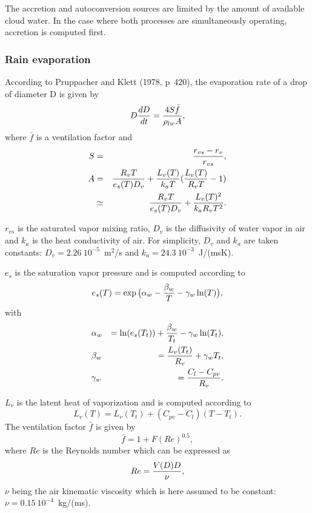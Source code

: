 The accretion and autoconversion sources are limited by the amount of available
cloud water. In the case where both processes are simultaneously operating,
accretion is computed first.

\subsubsection{Rain evaporation}
According to Pruppacher and Klett (1978, p~420), the evaporation rate of a drop
of diameter D is given by
\begin{equation}
D {dD \over dt} = {4S \bar f \over \rho_{lw} A}, \label{eq17}
\end{equation}
where $\bar f$ is a ventilation factor and
\begin{eqnarray}
S&=& {r_{vs}-r_v \over r_{vs}}, \\
A&=& {R_v T \over e_s(T) D_v} + {L_v(T) \over k_a T}({L_v(T) \over R_v T} -1)\\
 &\simeq &{R_v T \over e_s(T) D_v} + {L_v(T)^2 \over k_a R_v T^2}  .
\end{eqnarray}

$r_{vs}$ is the saturated vapor mixing ratio, $D_v$ is the diffusivity of water
vapor in air and $k_a$ is the heat conductivity of air.
For simplicity, $D_v$ and  $k_a$ are taken constants:
$D_v=2.26\ 10^{-5}$~m$^2$/s and $k_a= 24.3 \ 10 ^{-3}$~J/(msK).

$e_s$ is the saturation vapor pressure and is computed according to
\begin{equation}
\label{eq21}
e_s(T)= \exp \big( \alpha_w - {\beta_w \over T} - \gamma_w \ln (T) \big),
\end{equation}
with
\begin{eqnarray}
&\alpha_w   &= \ln (e_s(T_t))+{\beta_w \over T_t} - \gamma_w \ln (T_t), \\
&\beta_w   &= {L_v(T_t) \over R_v} + \gamma_w T_t, \\
&\gamma_w  &= {C_l -C_{pv} \over R_v}.
\end{eqnarray}

$L_v$ is the latent heat of vaporization and is computed according to
\begin{equation}
L_v(T) = L_v(T_t) + (C_{pv} - C_l)(T-T_t).
\end{equation}
The ventilation factor $\bar f$ is given by
\begin{equation}
\bar f = 1 + F (Re) ^{0.5},\label{eq26}
\end{equation}
where $Re$ is the Reynolds number which can be expressed as
\begin{equation}
Re= {V(D) D \over \nu}, \label{eq27}
\end{equation}
$\nu$  being  the air kinematic viscosity which is here assumed to be constant:
$\nu=0.15 \ 10^{-4}$~kg/(ms).

